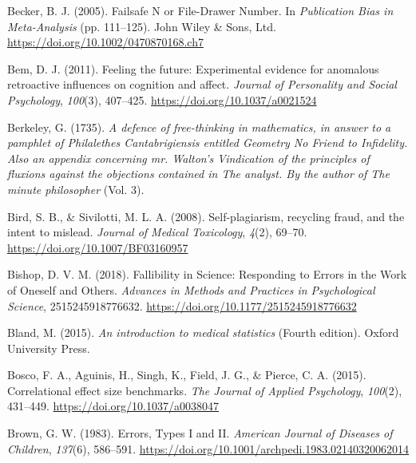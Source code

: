 \documentclass[
  letterpaper,
  DIV=11,
  numbers=noendperiod]{scrreprt}
\newlength{\cslhangindent}
\newlength{\cslentryspacingunit} %
\newenvironment{CSLReferences}[2] %
 {%
  \setlength{\parindent}{0pt}
  \ifodd #1
  \let\oldpar\par
  \def\par{\hangindent=\cslhangindent\oldpar}
  \fi
  \setlength{\parskip}{#2\cslentryspacingunit}
 }%
 {}
\begin{document}
\begin{CSLReferences}{1}{0}
\leavevmode{}%
Becker, B. J. (2005). Failsafe {N} or {File-Drawer Number}. In
\emph{Publication {Bias} in {Meta-Analysis}} (pp. 111--125). {John Wiley
\& Sons, Ltd}. \url{https://doi.org/10.1002/0470870168.ch7}

\leavevmode{}%
Bem, D. J. (2011). Feeling the future: Experimental evidence for
anomalous retroactive influences on cognition and affect. \emph{Journal
of Personality and Social Psychology}, \emph{100}(3), 407--425.
\url{https://doi.org/10.1037/a0021524}

\leavevmode{}%
Berkeley, G. (1735). \emph{A defence of free-thinking in mathematics, in
answer to a pamphlet of {Philalethes Cantabrigiensis} entitled {Geometry
No Friend} to {Infidelity}. {Also} an appendix concerning mr. {Walton}'s
{Vindication} of the principles of fluxions against the objections
contained in {The} analyst. {By} the author of {The} minute philosopher}
(Vol. 3).

\leavevmode{}%
Bird, S. B., \& Sivilotti, M. L. A. (2008). Self-plagiarism, recycling
fraud, and the intent to mislead. \emph{Journal of Medical Toxicology},
\emph{4}(2), 69--70. \url{https://doi.org/10.1007/BF03160957}

\leavevmode{}%
Bishop, D. V. M. (2018). Fallibility in {Science}: {Responding} to
{Errors} in the {Work} of {Oneself} and {Others}. \emph{Advances in
Methods and Practices in Psychological Science}, 2515245918776632.
\url{https://doi.org/10.1177/2515245918776632}

\leavevmode{}%
Bland, M. (2015). \emph{An introduction to medical statistics} (Fourth
edition). {Oxford University Press}.

\leavevmode{}%
Bosco, F. A., Aguinis, H., Singh, K., Field, J. G., \& Pierce, C. A.
(2015). Correlational effect size benchmarks. \emph{The Journal of
Applied Psychology}, \emph{100}(2), 431--449.
\url{https://doi.org/10.1037/a0038047}

\leavevmode{}%
Brown, G. W. (1983). Errors, {Types I} and {II}. \emph{American Journal
of Diseases of Children}, \emph{137}(6), 586--591.
\url{https://doi.org/10.1001/archpedi.1983.02140320062014}


\end{CSLReferences}
\end{document}
